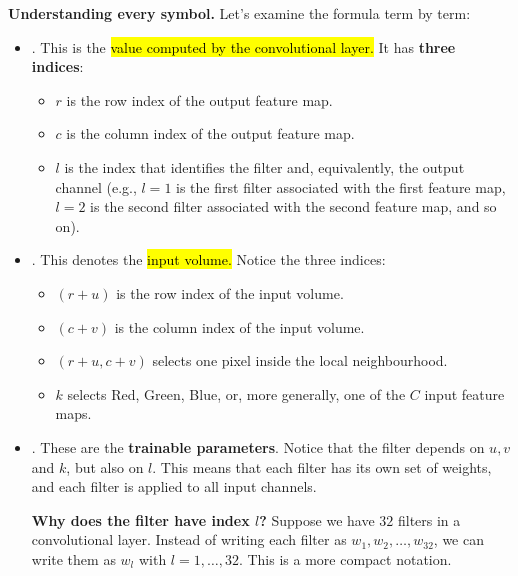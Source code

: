 \highspace
\textcolor{Green3}{ \textbf{Understanding every symbol.}} Let's examine the formula term by term:
\begin{itemize}
    \item[\textcolor{Green3}{\faIcon{wave-square}}] . This is the \hl{value computed by the convolutional layer.} It has \textbf{three indices}:
    \begin{itemize}
        \item $r$ is the row index of the output feature map.
        \item $c$ is the column index of the output feature map.
        \item $l$ is the index that identifies the filter and, equivalently, the output channel (e.g., $l=1$ is the first filter associated with the first feature map, $l=2$ is the second filter associated with the second feature map, and so on).
    \end{itemize}


    \item[\textcolor{Green3}{\faIcon{sign-in-alt}}] . This denotes the \hl{input volume.} Notice the three indices:
    \begin{itemize}
        \item $(r+u)$ is the row index of the input volume.
        \item $(c+v)$ is the column index of the input volume.
        \item $(r+u, c+v)$ selects one pixel inside the local neighbourhood.
        \item $k$ selects Red, Green, Blue, or, more generally, one of the $C$ input feature maps.
    \end{itemize}


    \item[\textcolor{Green3}{\faIcon{sliders-h}}] . These are the \textbf{trainable parameters}. Notice that the filter depends on $u,v$ and $k$, but also on $l$. This means that each filter has its own set of weights, and each filter is applied to all input channels.

    \textcolor{Green3}{ \textbf{Why does the filter have index $l$?}} Suppose we have $32$ filters in a convolutional layer. Instead of writing each filter as $w_1, w_2, \dots, w_{32}$, we can write them as $w_l$ with $l=1,\dots,32$. This is a more compact notation.



\end{itemize}
